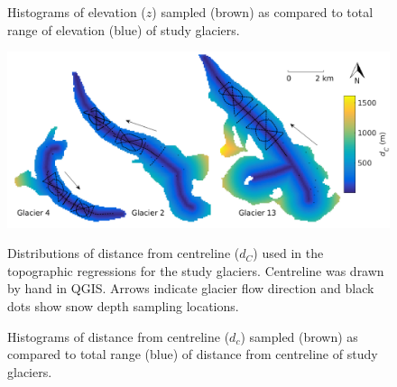 \documentclass[12pt]{article}
\newcommand{\topomap}{Arrows indicate glacier flow direction and black dots show snow depth sampling locations.}
\begin{document}
\begin{figure}[H]
	\caption{Histograms of elevation ($z$) sampled (brown) as compared to total range of elevation (blue) of study glaciers.}
	\label{sampledRange:elev}
\end{figure}

\begin{figure}[H]
	\centering
	\includegraphics[width=\textwidth]{Map_centreD.png}\\
	\caption{Distributions of distance from centreline ($d_C$) used in the topographic regressions for the study glaciers. Centreline was drawn by hand in QGIS. \topomap}
	\label{map:centreD}
\end{figure}

\begin{figure}[H]
	\caption{Histograms of distance from centreline ($d_c$) sampled (brown) as compared to total range (blue) of distance from centreline of study glaciers.}
	\label{sampledRange:centreD}
\end{figure}
\end{document}
